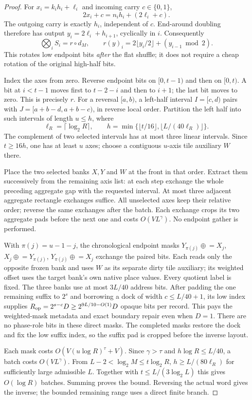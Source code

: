 \documentclass[11pt]{article}
\begin{document}
\begin{proof}
For $x_i=k_i h_i+\ell_i$ and incoming carry $c\in\{0,1\}$,
\[
 2x_i+c=n_i h_i+(2\ell_i+c).
\]
The outgoing carry is exactly $h_i$, independent of $c$.
End-around doubling therefore has output
$y_i=2\ell_i+h_{i+1}$, cyclically in $i$.
Consequently
\[
 \bigotimes_i S_i=r\circ d_M,\qquad
 r(y)_i=2\lfloor y_i/2\rfloor+(y_{i-1}\bmod2).
\]
This rotates low endpoint bits \emph{after} the flat shuffle; it does
not require a cheap rotation of the original high-half bits.

Index the axes from zero. Reverse endpoint bits on $[0,t-1)$ and then
on $[0,t)$. A bit at $i<t-1$ moves first to $t-2-i$ and then to $i+1$;
the last bit moves to zero. This is precisely $r$. For a reversal
$[a,b)$, a left-half interval $I=[c,d)$ pairs with
$J=[a+b-d,a+b-c)$, in reverse local order. Partition the left half
into such intervals of length $u\le h$, where
\[
 \ell_R=\lceil\log_2R\rceil,\qquad
 h=\min\{\lfloor t/16\rfloor,\lfloor L/(40\ell_R)\rfloor\}.
\]
The complement of two selected intervals has at most three linear
intervals. Since $t\ge16h$, one has at least $u$ axes; choose a
contiguous $u$-axis tile auxiliary $W$ there.

Place the two selected banks $X,Y$ and $W$ at the front in that order.
Extract them successively from the remaining axis list: at each step
exchange the whole preceding aggregate gap with the requested interval.
At most three adjacent aggregate rectangle exchanges suffice. All
unselected axes keep their relative order; reverse the same exchanges
after the batch. Each exchange crops its two aggregate pads before the
next one and costs $O(VL^\gamma)$. No endpoint gather is performed.

With $\pi(j)=u-1-j$, the chronological endpoint masks
$Y_{\pi(j)}\mathrel{\oplus}=X_j$,
$X_j\mathrel{\oplus}=Y_{\pi(j)}$,
$Y_{\pi(j)}\mathrel{\oplus}=X_j$
exchange the paired bits. Each reads only the opposite frozen bank
and uses $W$ as its separate dirty tile auxiliary; its weighted offset
uses the target bank's own native place values. Every quotient label
is fixed. The three banks use at most $3L/40$ address bits. After
padding the one remaining suffix to $2^s$ and borrowing a dock of
width $c\le L/40+1$, its low index supplies
$R_{\rm op}=2^{s-c}D\ge2^{9L/10-O(1)}D$ opaque bits per record.
This pays the weighted-mask metadata and exact boundary repair even
when $D=1$. There are no phase-role bits in these direct masks.
The completed masks restore the dock and fix the low suffix index,
so the suffix pad is cropped before the inverse layout.

Each mask costs $O(V(u\log R)^\tau+V)$.
Since $\gamma>\tau$ and $h\log R\le L/40$, a batch costs
$O(VL^\gamma)$. From $L-2<\log_2M\le t\log_2R$,
$h\ge L/(80\ell_R)$ for sufficiently large admissible $L$.
Together with $t\le L/(3\log_2L)$ this gives $O(\log R)$ batches.
Summing proves the bound. Reversing the actual word gives the inverse;
the bounded remaining range uses a direct finite branch.
\end{proof}
\end{document}
